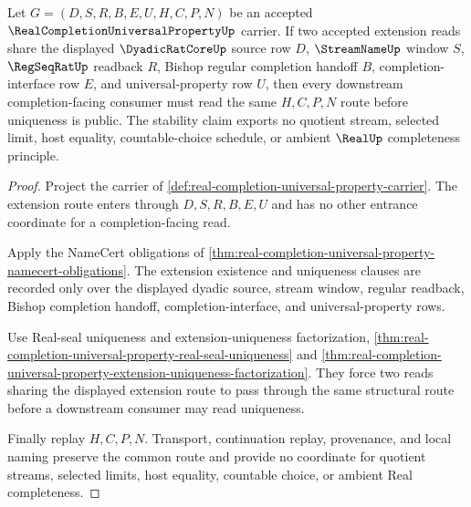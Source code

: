 \begin{theorem}
\label{thm:real-completion-universal-property-extension-stability}
Let $G=(D,S,R,B,E,U,H,C,P,N)$ be an accepted $\RealCompletionUniversalPropertyUp$ carrier. If two accepted extension reads share the displayed $\DyadicRatCoreUp$ source row $D$, $\StreamNameUp$ window $S$, $\RegSeqRatUp$ readback $R$, Bishop regular completion handoff $B$, completion-interface row $E$, and universal-property row $U$, then every downstream completion-facing consumer must read the same $H,C,P,N$ route before uniqueness is public. The stability claim exports no quotient stream, selected limit, host equality, countable-choice schedule, or ambient $\RealUp$ completeness principle.
\end{theorem}
\begin{proof}
Project the carrier of \autoref{def:real-completion-universal-property-carrier}. The extension route enters through $D,S,R,B,E,U$ and has no other entrance coordinate for a completion-facing read.

Apply the NameCert obligations of \autoref{thm:real-completion-universal-property-namecert-obligations}. The extension existence and uniqueness clauses are recorded only over the displayed dyadic source, stream window, regular readback, Bishop completion handoff, completion-interface, and universal-property rows.

Use Real-seal uniqueness and extension-uniqueness factorization, \autoref{thm:real-completion-universal-property-real-seal-uniqueness} and \autoref{thm:real-completion-universal-property-extension-uniqueness-factorization}. They force two reads sharing the displayed extension route to pass through the same structural route before a downstream consumer may read uniqueness.

Finally replay $H,C,P,N$. Transport, continuation replay, provenance, and local naming preserve the common route and provide no coordinate for quotient streams, selected limits, host equality, countable choice, or ambient Real completeness.
\end{proof}
